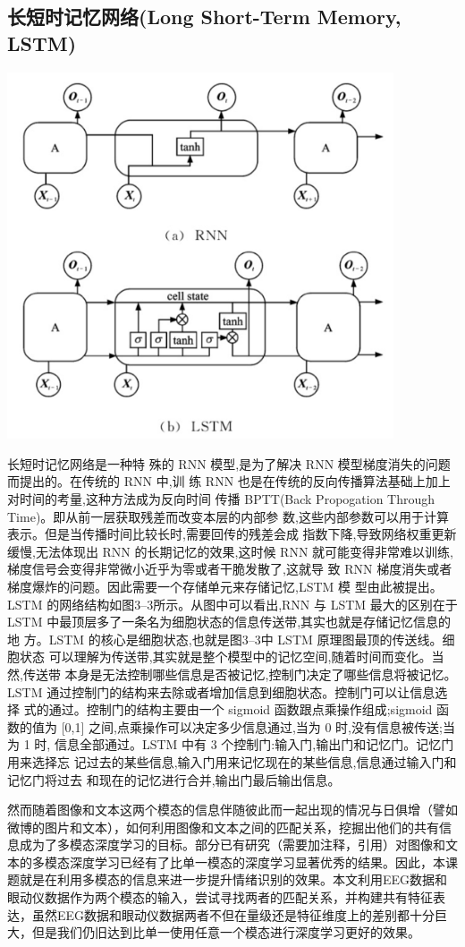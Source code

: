 \subsection{长短时记忆网络(Long Short-Term Memory, LSTM)}{
	\centerline{\includegraphics[width=4.5in]{figure/lstm.png}}
	长短时记忆网络是一种特 殊的 RNN 模型,是为了解决 RNN 模型梯度消失的问题而提出的。在传统的 RNN 中,训 练 RNN 也是在传统的反向传播算法基础上加上对时间的考量,这种方法成为反向时间 传播 BPTT(Back Propogation Through Time)。即从前一层获取残差而改变本层的内部参 数,这些内部参数可以用于计算表示。但是当传播时间比较长时,需要回传的残差会成 指数下降,导致网络权重更新缓慢,无法体现出 RNN 的长期记忆的效果,这时候 RNN 就可能变得非常难以训练,梯度信号会变得非常微小近乎为零或者干脆发散了,这就导 致 RNN 梯度消失或者梯度爆炸的问题。因此需要一个存储单元来存储记忆,LSTM 模 型由此被提出。
LSTM 的网络结构如图3–3所示。从图中可以看出,RNN 与 LSTM 最大的区别在于 LSTM 中最顶层多了一条名为细胞状态的信息传送带,其实也就是存储记忆信息的地 方。LSTM 的核心是细胞状态,也就是图3–3中 LSTM 原理图最顶的传送线。细胞状态 可以理解为传送带,其实就是整个模型中的记忆空间,随着时间而变化。当然,传送带 本身是无法控制哪些信息是否被记忆,控制门决定了哪些信息将被记忆。
LSTM 通过控制门的结构来去除或者增加信息到细胞状态。控制门可以让信息选择 式的通过。控制门的结构主要由一个 sigmoid 函数跟点乘操作组成;sigmoid 函数的值为 [0,1] 之间,点乘操作可以决定多少信息通过,当为 0 时,没有信息被传送;当为 1 时, 信息全部通过。LSTM 中有 3 个控制门:输入门,输出门和记忆门。记忆门用来选择忘 记过去的某些信息,输入门用来记忆现在的某些信息,信息通过输入门和记忆门将过去 和现在的记忆进行合并,输出门最后输出信息。
}
	然而随着图像和文本这两个模态的信息伴随彼此而一起出现的情况与日俱增（譬如微博的图片和文本），如何利用图像和文本之间的匹配关系，挖掘出他们的共有信息成为了多模态深度学习的目标。部分已有研究（需要加注释，引用）对图像和文本的多模态深度学习已经有了比单一模态的深度学习显著优秀的结果。因此，本课题就是在利用多模态的信息来进一步提升情绪识别的效果。本文利用EEG数据和眼动仪数据作为两个模态的输入，尝试寻找两者的匹配关系，并构建共有特征表达，虽然EEG数据和眼动仪数据两者不但在量级还是特征维度上的差别都十分巨大，但是我们仍旧达到比单一使用任意一个模态进行深度学习更好的效果。

